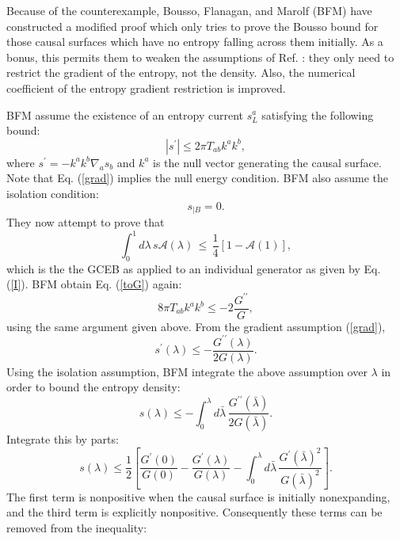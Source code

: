 \documentclass[12pt]{article}
\begin{document}
Because of the counterexample, Bousso, Flanagan, and Marolf (BFM) \cite{BFM03} have constructed a modified proof which only tries to prove the Bousso bound for those causal surfaces which have no entropy falling across them initially.  As a bonus, this permits them to weaken the assumptions of Ref. \cite{BFM03}: they only need to restrict the gradient of the entropy, not the density.  Also, the numerical coefficient of the entropy gradient restriction is improved.

BFM assume the existence of an entropy current $s^{a}_{L}$ satisfying the following bound:
\begin{equation}\label{grad}
|s^{\prime}| \le 2\pi T_{ab}k^a k^b,
\end{equation}
where $s^{\prime} = -k^a k^b \nabla_{a}s_{b}$ and $k^a$ is the null vector generating the causal surface.  Note that Eq. (\ref{grad}) implies the null energy condition.  BFM also assume the isolation condition:
\begin{equation}\label{isolation}
s_{|B} = 0.
\end{equation}
They now attempt to prove that
\begin{equation}\label{noI}
\int_0^1 d\lambda\,s\mathcal{A}(\lambda)\,\le\,\frac{1}{4}[1 - \mathcal{A}(1)],
\end{equation}
which is the the GCEB as applied to an individual generator as given by Eq. (\ref{I}).  BFM obtain Eq. (\ref{toG}) again:
\begin{equation}
8\pi T_{ab}k^ak^b \le -2\frac{G^{\prime\prime}}{G},
\end{equation}
using the same argument given above.  From the gradient assumption (\ref{grad}),
\begin{equation}
s^{\prime}(\lambda) \le -\frac{G^{\prime\prime}(\lambda)}{2G(\lambda)}.
\end{equation}
Using the isolation assumption, BFM integrate the above assumption over $\lambda$ in order to bound the entropy density:
\begin{equation}
s(\lambda) \le -\int^{\lambda}_0 d\bar{\lambda}\,
\frac{G^{\prime\prime}(\bar{\lambda})}{2G(\bar{\lambda})}.
\end{equation}
Integrate this by parts:
\begin{equation}
s(\lambda) \le \frac{1}{2}\left[
\frac{G^{\prime}(0)}{G(0)} - \frac{G^{\prime}(\lambda)}{G(\lambda)}
- \int^{\lambda}_0 d\bar{\lambda}\,
\frac{G^{\prime}(\bar{\lambda})^2}{G(\bar{\lambda})^2}
\right].
\end{equation}
The first term is nonpositive when the causal surface is initially nonexpanding, and the third term is explicitly nonpositive.  Consequently these terms can be removed from the inequality:
\end{document}
